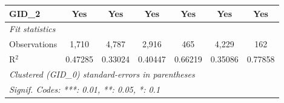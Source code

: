 \begin{tabular}{lcccccc}
   GID\_2             & Yes                    & Yes                          & Yes                     & Yes                            & Yes                     & Yes\\  
   \midrule
   \emph{Fit statistics}\\
   Observations       & 1,710                  & 4,787                        & 2,916                   & 465                            & 4,229                   & 162\\  
   R$^2$              & 0.47285                & 0.33024                      & 0.40447                 & 0.66219                        & 0.35086                 & 0.77858\\  
   \midrule \midrule
   \multicolumn{7}{l}{\emph{Clustered (GID\_0) standard-errors in parentheses}}\\
   \multicolumn{7}{l}{\emph{Signif. Codes: ***: 0.01, **: 0.05, *: 0.1}}\\
\end{tabular}
\par\endgroup



